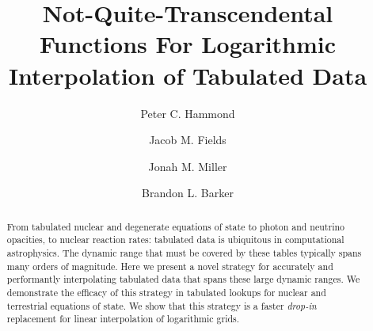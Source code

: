 \documentclass[linenumbers,twocolumn]{aastex631}
\begin{document}
\title{Not-Quite-Transcendental Functions For Logarithmic Interpolation of Tabulated Data}


\author[0000-0002-9447-1043
]{Peter C. Hammond}

\author[0000-0001-5705-1712]{Jacob M. Fields}

\author[0000-0001-6432-7860]{Jonah M. Miller}

\author[0000-0002-8825-0893]{Brandon L. Barker}
 
\begin{abstract}

From tabulated nuclear and degenerate equations of state to photon and neutrino opacities, to nuclear reaction rates: tabulated data is ubiquitous in computational astrophysics. The dynamic range that must be covered by these tables typically spans many orders of magnitude. Here we present a novel strategy for accurately and performantly interpolating tabulated data that spans these large dynamic ranges. We demonstrate the efficacy of this strategy in tabulated lookups for nuclear and terrestrial equations of state. We show that this strategy is a faster \textit{drop-in} replacement for linear interpolation of logarithmic grids.

\end{abstract}

\end{document}
